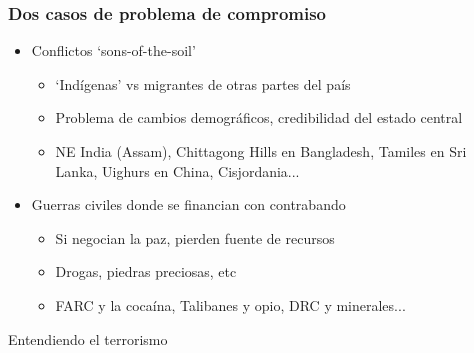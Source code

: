 \begin{frame}
\frametitle{Dos casos de problema de compromiso}
\centering

\begin{itemize}
    \item[1.] Conflictos `sons-of-the-soil'
    \begin{itemize}
        \item `Indígenas' vs migrantes de otras partes del país
        \item Problema de cambios demográficos, credibilidad del estado central
        \item NE India (Assam), Chittagong Hills en Bangladesh, Tamiles en Sri Lanka, Uighurs en China, Cisjordania...
    \end{itemize}
    \item<2->[2.] Guerras civiles donde se financian con contrabando
    \begin{itemize}
        \item Si negocian la paz, pierden fuente de recursos
        \item Drogas, piedras preciosas, etc
        \item FARC y la cocaína, Talibanes y opio, DRC y minerales...
    \end{itemize}
\end{itemize}

\end{frame}
\note{}

\begin{transitionframe}
Entendiendo el terrorismo
\end{transitionframe}
\note{}

